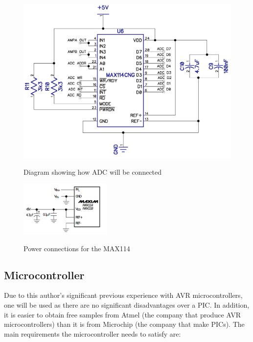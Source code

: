 \begin{figure}[h]
  \includegraphics[width=\textwidth]{img/adc/circuit.png}
  \label{fig:adcCircuitDiagram}
  \caption[ADC Circuit Diagram]{Diagram showing how ADC will be connected}
\end{figure}

\begin{figure}
  \centering
  \includegraphics[width=0.4\textwidth]{img/adc/max114power.png}
  \label{fig:MAX114Power}
  \caption[ADC Power Connections]{Power connections for the MAX114~\autocite{MAX114}}
\end{figure}


\subsection{Microcontroller}

Due to this author's significant previous experience with AVR microcontrollers,
one will be used as there are no significant disadvantages over a PIC. In
addition, it is easier to obtain free samples from Atmel (the company that
produce AVR microcontrollers) than it is from Microchip (the company that make
PICs). The main requirements the microcontroller needs to satisfy are:

